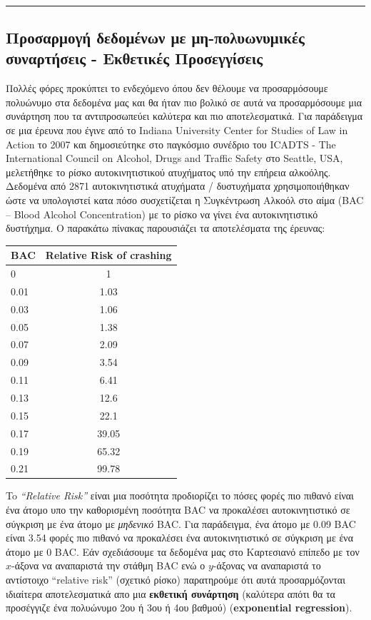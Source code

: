 \documentclass[12pt]{article}
\begin{document}
    \begin{center}
    \end{center}
    { \hspace*{\fill} \\}
    
\begin{center}\rule{0.5\linewidth}{0.5pt}\end{center}   

 \subsection{Προσαρμογή δεδομένων με μη-πολυωνυμικές συναρτήσεις -
Eκθετικές Προσεγγίσεις}

    Πολλές φόρες προκύπτει το ενδεχόμενο όπου δεν θέλουμε να προσαρμόσουμε
πολυώνυμο στα δεδομένα μας και θα ήταν πιο βολικό σε αυτά να
προσαρμόσουμε μια συνάρτηση που τα αντιπροσωπεύει καλύτερα και πιο
αποτελεσματικά. Για παράδειγμα σε μια έρευνα που έγινε από το Indiana
University Center for Studies of Law in Action το 2007 και δημοσιεύτηκε
στο παγκόσμιο συνέδριο του ICADTS - The International Council on
Alcohol, Drugs and Traffic Safety στο Seattle, USA, μελετήθηκε το ρίσκο
αυτοκινητιστικού ατυχήματος υπό την επήρεια αλκοόλης. Δεδομένα από 2871
αυτοκινητιστικά ατυχήματα / δυστυχήματα χρησιμοποιήθηκαν ώστε να
υπολογιστεί κατα πόσο συσχετίζεται η Συγκέντρωση Αλκοόλ στο αίμα (BAC --
Blood Alcohol Concentration) με το ρίσκο να γίνει ένα αυτοκινητιστικό
δυστήχημα. Ο παρακάτω πίνακας παρουσιάζει τα αποτελέσματα της έρευνας:

\begin{longtable}[]{@{}lc@{}}
\toprule
BAC & Relative Risk of crashing\tabularnewline
\midrule
\endhead
0 & 1\tabularnewline
0.01 & 1.03\tabularnewline
0.03 & 1.06\tabularnewline
0.05 & 1.38\tabularnewline
0.07 & 2.09\tabularnewline
0.09 & 3.54\tabularnewline
0.11 & 6.41\tabularnewline
0.13 & 12.6\tabularnewline
0.15 & 22.1\tabularnewline
0.17 & 39.05\tabularnewline
0.19 & 65.32\tabularnewline
0.21 & 99.78\tabularnewline
\bottomrule
\end{longtable}

To \emph{``Relative Risk''} είναι μια ποσότητα προδιορίζει το πόσες
φορές πιο πιθανό είναι ένα άτομο υπο την καθορισμένη ποσότητα BAC να
προκαλέσει αυτοκινητιστικό σε σύγκριση με ένα άτομο με \emph{μηδενικό}
BAC. Για παράδειγμα, ένα άτομο με 0.09 BAC είναι 3.54 φορές πιο πιθανό
να προκαλέσει ένα αυτοκινητιστικό σε σύγκριση με ένα άτομο με 0 BAC. Εάν
σχεδιάσουμε τα δεδομένα μας στο Καρτεσιανό επίπεδο με τον \(x\)-άξονα να
αναπαριστά την στάθμη BAC ενώ ο \(y\)-άξονας να αναπαριστά το αντίστοιχο
``relative risk'' (σχετικό ρίσκο) παρατηρούμε ότι αυτά προσαρμόζονται
ιδιαίτερα αποτελεσματικά απο μια \textbf{εκθετική συνάρτηση} (καλύτερα
απότι θα τα προσέγγιζε ένα πολυώνυμο 2ου ή 3ου ή 4ου βαθμού)
(\textbf{exponential regression}).
\end{document}
